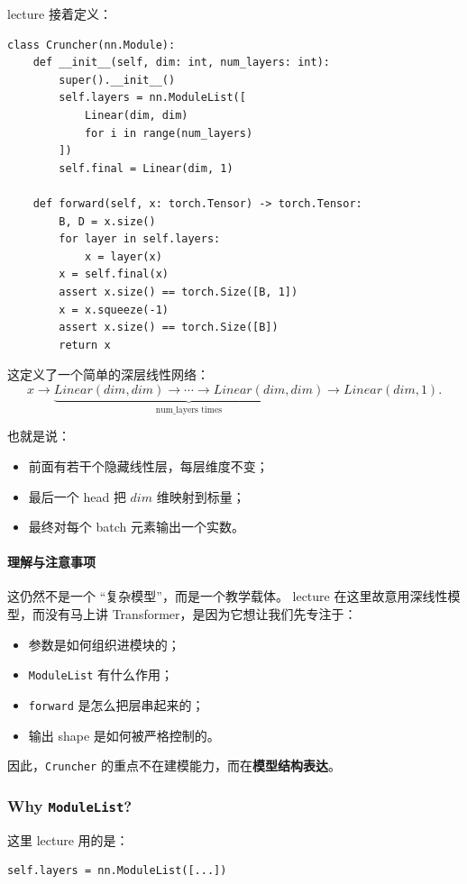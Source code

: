 \documentclass[a4paper,UTF8]{article}
\numberwithin{equation}{section}
\begin{document}
lecture 接着定义：
\begin{verbatim}
class Cruncher(nn.Module):
    def __init__(self, dim: int, num_layers: int):
        super().__init__()
        self.layers = nn.ModuleList([
            Linear(dim, dim)
            for i in range(num_layers)
        ])
        self.final = Linear(dim, 1)

    def forward(self, x: torch.Tensor) -> torch.Tensor:
        B, D = x.size()
        for layer in self.layers:
            x = layer(x)
        x = self.final(x)
        assert x.size() == torch.Size([B, 1])
        x = x.squeeze(-1)
        assert x.size() == torch.Size([B])
        return x
\end{verbatim}

这定义了一个简单的深层线性网络：
\[
x \to \underbrace{Linear(dim,dim) \to \cdots \to Linear(dim,dim)}_{\text{num\_layers times}} \to Linear(dim,1).
\]

也就是说：
\begin{itemize}
    \item 前面有若干个隐藏线性层，每层维度不变；
    \item 最后一个 head 把 \(dim\) 维映射到标量；
    \item 最终对每个 batch 元素输出一个实数。
\end{itemize}

\paragraph{理解与注意事项}
这仍然不是一个 ``复杂模型''，而是一个教学载体。  
lecture 在这里故意用深线性模型，而没有马上讲 Transformer，是因为它想让我们先专注于：
\begin{itemize}
    \item 参数是如何组织进模块的；
    \item \verb|ModuleList| 有什么作用；
    \item \verb|forward| 是怎么把层串起来的；
    \item 输出 shape 是如何被严格控制的。
\end{itemize}

因此，\verb|Cruncher| 的重点不在建模能力，而在\textbf{模型结构表达}。

\subsubsection{Why \texttt{ModuleList}?}

这里 lecture 用的是：
\begin{verbatim}
self.layers = nn.ModuleList([...])
\end{verbatim}
\end{document}
